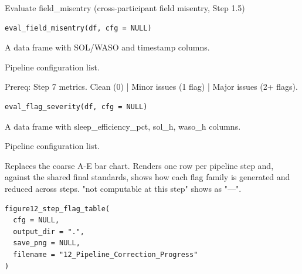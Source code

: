 \documentclass[a4paper]{book}
\begin{document}
%
\begin{Description}
Evaluate field\_misentry (cross-participant field misentry, Step 1.5)
\end{Description}
%
\begin{Usage}
\begin{verbatim}
eval_field_misentry(df, cfg = NULL)
\end{verbatim}
\end{Usage}
%
\begin{Arguments}
\begin{ldescription}
\item[\code{df}] A data frame with SOL/WASO and timestamp columns.

\item[\code{cfg}] Pipeline configuration list.
\end{ldescription}
\end{Arguments}
%
\begin{Description}
Prereq: Step 7 metrics. Clean (0) | Minor issues (1 flag) | Major issues (2+ flags).
\end{Description}
%
\begin{Usage}
\begin{verbatim}
eval_flag_severity(df, cfg = NULL)
\end{verbatim}
\end{Usage}
%
\begin{Arguments}
\begin{ldescription}
\item[\code{df}] A data frame with sleep\_efficiency\_pct, sol\_h, waso\_h columns.

\item[\code{cfg}] Pipeline configuration list.
\end{ldescription}
\end{Arguments}
%
\begin{Description}
Replaces the coarse A-E bar chart. Renders one row per pipeline step and,
against the shared final standards, shows how each flag family is generated
and reduced across steps. "not computable at this step" shows as "---".
\end{Description}
%
\begin{Usage}
\begin{verbatim}
figure12_step_flag_table(
  cfg = NULL,
  output_dir = ".",
  save_png = NULL,
  filename = "12_Pipeline_Correction_Progress"
)
\end{verbatim}
\end{Usage}
\end{document}
